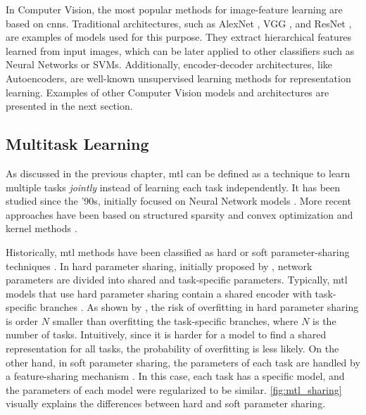 In Computer Vision, the most popular methods for image-feature learning are based on \aclp{cnn}. Traditional architectures, such as AlexNet \citep{krizhevsky2017imagenet}, VGG \citep{simonyan2014very}, and ResNet \citep{he2016deep}, are examples of models used for this purpose. They extract hierarchical features learned from input images, which can be later applied to other classifiers such as Neural Networks or SVMs. Additionally, encoder-decoder architectures, like Autoencoders, are well-known unsupervised learning methods for representation learning. Examples of other Computer Vision models and architectures are presented in the next section.
 
\subsection{Multitask Learning}
 
As discussed in the previous chapter, \acl{mtl} can be defined as a technique to learn multiple tasks \textit{jointly} instead of learning each task independently. It has been studied since the '90s, initially focused on Neural Network models \citep{ thrun1998learning, Caruana1997, baxter2000model}. More recent approaches have been based on structured sparsity and convex optimization \citep{argyriou2006multi} and kernel methods \citep{evgeniou2005learning}.
 
Historically, \acs{mtl} methods have been classified as hard or soft parameter-sharing techniques \citep{vandenhende2021multi}. In hard parameter sharing, initially proposed by \cite{Caruana1997}, network parameters are divided into shared and task-specific parameters. Typically, \acs{mtl} models that use hard parameter sharing contain a shared encoder with task-specific branches \citep{kendall2018multi, chen2018gradnorm, sener2018multi}. As shown by \cite{baxter1997bayesian}, the risk of overfitting in hard parameter sharing is order $N$ smaller than overfitting the task-specific branches, where $N$ is the number of tasks. Intuitively, since it is harder for a model to find a shared representation for all tasks, the probability of overfitting is less likely. On the other hand, in soft parameter sharing, the parameters of each task are handled by a feature-sharing mechanism \citep{ruder2019latent, gao2019nddr, liu2019end}. In this case, each task has a specific model, and the parameters of each model were regularized to be similar. \autoref{fig:mtl_sharing} visually explains the differences between hard and soft parameter sharing.
 
